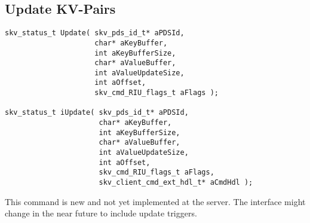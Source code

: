 \subsection{Update KV-Pairs}\label{sec:api:update}
\begin{lstlisting}
skv_status_t Update( skv_pds_id_t* aPDSId,
                     char* aKeyBuffer,
                     int aKeyBufferSize,
                     char* aValueBuffer,
                     int aValueUpdateSize,
                     int aOffset,
                     skv_cmd_RIU_flags_t aFlags );

skv_status_t iUpdate( skv_pds_id_t* aPDSId,
                      char* aKeyBuffer,
                      int aKeyBufferSize,
                      char* aValueBuffer,
                      int aValueUpdateSize,
                      int aOffset,
                      skv_cmd_RIU_flags_t aFlags,
                      skv_client_cmd_ext_hdl_t* aCmdHdl );
\end{lstlisting}
This command is new and not yet implemented at the server. The
interface might change in the near future to include update triggers.


